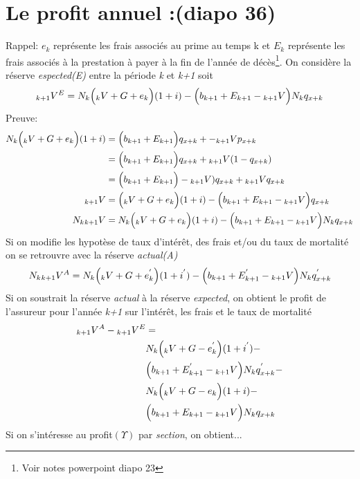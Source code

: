 \documentclass[11pt,french]{report}
\newcommand{\indiceGauche}[2]{{\vphantom{#2}}_{#1}#2}
\begin{document}
\section{Le profit annuel :(diapo 36)}
Rappel: $e_k$ représente les frais associés au prime au temps k et $E_k$ représente les frais associés à la prestation à payer à la fin de l'année de décès\footnote{Voir notes powerpoint diapo 23}.
On considère la réserve \emph{espected(E)} entre la période \textit{k} et \textit{k+1} soit
\begin{align*}
\indiceGauche{k+1}{V}^{E} = N_k\Big( \indiceGauche{k}{V} + G + e_k\Big)(1+i) - \Big(b_{k+1} + E_{k+1} - \indiceGauche{k+1}{V} \Big) N_k q_{x+k}
\end{align*}
Preuve:
\begin{align*}
N_k \Big( \indiceGauche{k}{V} + G + e_k\Big)(1+i) &=  \Big(b_{k+1} + E_{k+1}\Big)q_{x+k} + - \indiceGauche{k+1}{V}p_{x+k} \\
&=  \Big(b_{k+1} + E_{k+1}\Big)q_{x+k} +  \indiceGauche{k+1}{V}(1 - q_{x+k}) \\
&=  \Big(b_{k+1} + E_{k+1}\Big) - \indiceGauche{k+1}{V})q_{x+k} +  \indiceGauche{k+1}{V}q_{x+k} \\
\indiceGauche{k+1}{V} &= \Big( \indiceGauche{k}{V} + G + e_k\Big)(1+i) - \Big(b_{k+1} + E_{k+1} - \indiceGauche{k+1}{V} \Big) q_{x+k}\\
N_k\indiceGauche{k+1}{V} &= N_k\Big( \indiceGauche{k}{V} + G + e_k\Big)(1+i) - \Big(b_{k+1} + E_{k+1} - \indiceGauche{k+1}{V} \Big)N_k q_{x+k}\\
\end{align*}
Si on modifie les hypotèse de taux d'intérêt, des frais et/ou du taux de mortalité on se retrouvre avec la réserve \textit{actual(A)}
\begin{align*}
N_k\indiceGauche{k+1}{V}^{A} &= N_k\Big( \indiceGauche{k}{V} + G + e_k^{'}\Big)(1+i^{'}) - \Big(b_{k+1} + E_{k+1}^{'} - \indiceGauche{k+1}{V} \Big)N_k q_{x+k}^{'}\\
\end{align*}
Si on soustrait la réserve \textit{actual} à la réserve \textit{expected}, on obtient le profit de l'assureur pour l'année \textit{k+1} sur l'intérêt, les frais et le taux de mortalité
\begin{align*}
\indiceGauche{k+1}{V}^{A} - \indiceGauche{k+1}{V}^{E} &= \\
& N_k\Big( \indiceGauche{k}{V} + G - e_k^{'}\Big)(1+i^{'}) - \\
&\Big(b_{k+1} + E_{k+1}^{'} - \indiceGauche{k+1}{V} \Big) N_k q_{x+k}^{'} -\\
&N_k \Big( \indiceGauche{k}{V} + G - e_k\Big)(1+i) -\\
& \Big(b_{k+1} + E_{k+1} - \indiceGauche{k+1}{V} \Big) N_k q_{x+k}
\end{align*}
Si on s'intéresse au profit$(\Upsilon)$ par \textit{section}, on obtient... 
\end{document}

